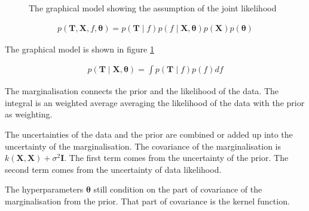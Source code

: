 \documentclass[12pt]{article}
\newenvironment{question}[2][Question]{\begin{trivlist}
\kern10pt
\item[\hskip \labelsep {\bfseries #1}\hskip \labelsep {\bfseries #2.}]}{\end{trivlist}}
\begin{document}
\begin{question}{7}
  \begin{figure}[h!]
    \centering
  \caption{The graphical model showing the assumption of the joint likelihood}
  \label{fig:Q7-graphs}
  \end{figure}
  \begin{align*}
    p(\mathbf{T}, \mathbf{X}, f, \bm{\theta}) 
      = p(\mathbf{T}\mid f)p(f \mid \mathbf{X},\bm{\theta})
      p(\mathbf{X})p(\bm{\theta}) 
  \end{align*}

The graphical model is shown in figure \ref{fig:Q7-graphs}
\end{question}

\begin{question}{8}
\begin{align*}
  p(\mathbf{T} \mid \mathbf{X}, \bm{\theta}) = \int p(\mathbf{T}\mid f)p(f) df
\end{align*}

The marginalisation connects the prior and the likelihood of the data. The
integral is an weighted average averaging the likelihood of the data with the prior
as weighting.

The uncertainties of the data and the prior are combined or added up into the 
uncertainty of the marginalisation. The covariance of the marginalisation is
$k(\mathbf{X},\mathbf{X}) + \sigma^2\mathbf{I}$. The first term comes from the
uncertainty of the prior. 
The second term comes from the uncertainty of data likelihood.


The hyperparameters $\bm{\theta}$ still condition on the part of covariance of the 
 marginalisation from the prior. That part of covariance is the kernel function.
\end{question}
\end{document}
